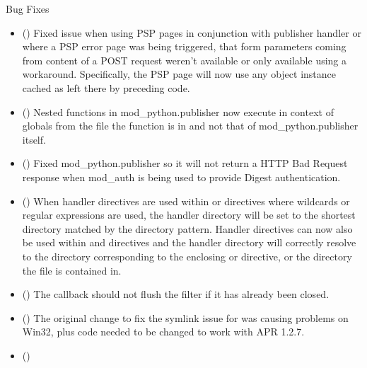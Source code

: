   Bug Fixes

  \begin{itemize}
  \item
      ()
      Fixed issue when using PSP pages in conjunction with publisher handler
      or where a PSP error page was being triggered, that form parameters
      coming from content of a POST request weren't available or only available
      using a workaround. Specifically, the PSP page will now use any
       object instance cached as  left
      there by preceding code.
    \item
      ()
      Nested  functions in mod_python.publisher now execute
      in context of globals from the file the function is in and not that
      of mod_python.publisher itself.
    \item
      ()
      Fixed mod_python.publisher so it will not return a HTTP Bad Request
      response when mod_auth is being used to provide Digest authentication.
    \item
      ()
      When handler directives are used within  or
       directives where wildcards or regular
      expressions are used, the handler directory will be set to the
      shortest directory matched by the directory pattern. Handler
      directives can now also be used within  and
       directives and the handler directory will correctly
      resolve to the directory corresponding to the enclosing
       or  directive, or the directory
      the  file is contained in.
    \item
      ()
      The  callback should not flush the filter if it
      has already been closed.
    \item
      ()
      The original change to fix the symlink issue for 
      was causing problems on Win32, plus code needed to be changed to work
      with APR 1.2.7.
    \item
      ()

\end{itemize}
